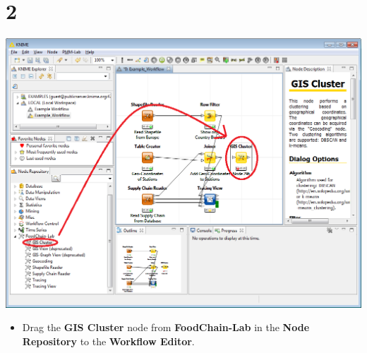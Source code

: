 \documentclass{beamer}
\begin{document}
\section{2}
\begin{frame}
	\begin{center}
  		\includegraphics[height=0.6\textheight]{2.png}
	\end{center}
	\begin{itemize}
		\item Drag the \textbf{GIS Cluster} node from \textbf{FoodChain-Lab} in the \textbf{Node Repository} to the \textbf{Workflow Editor}.
	\end{itemize}
\end{frame}
\end{document}
